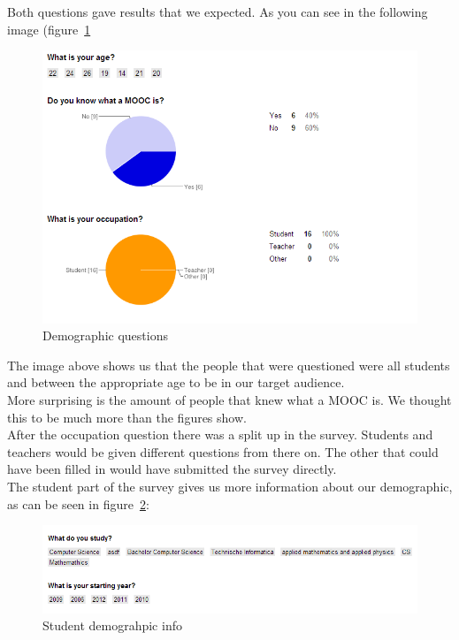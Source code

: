 Both questions gave results that we expected.
As you can see in the following image (figure~\ref{demographic_chart}

\begin{figure}[h]
    \centering
    \includegraphics[width=\textwidth]{images/demographic_chart}
    \caption{Demographic questions}
    \label{demographic_chart}
\end{figure}

The image above shows us that the people that were questioned were all students and between the appropriate age to be in our target audience.\\
More surprising is the amount of people that knew what a MOOC is.
We thought this to be much more than the figures show.\\
After the occupation question there was a split up in the survey.
Students and teachers would be given different questions from there on.
The other that could have been filled in would have submitted the survey directly.\\

The student part of the survey gives us more information about our demographic, as can be seen in figure~\ref{student_demographic_info}:\\
\begin{figure}[h]
    \centering
    \includegraphics[width=\textwidth]{images/student_demographic_info}
    \caption{Student demograhpic info }
    \label{student_demographic_info}
\end{figure}

